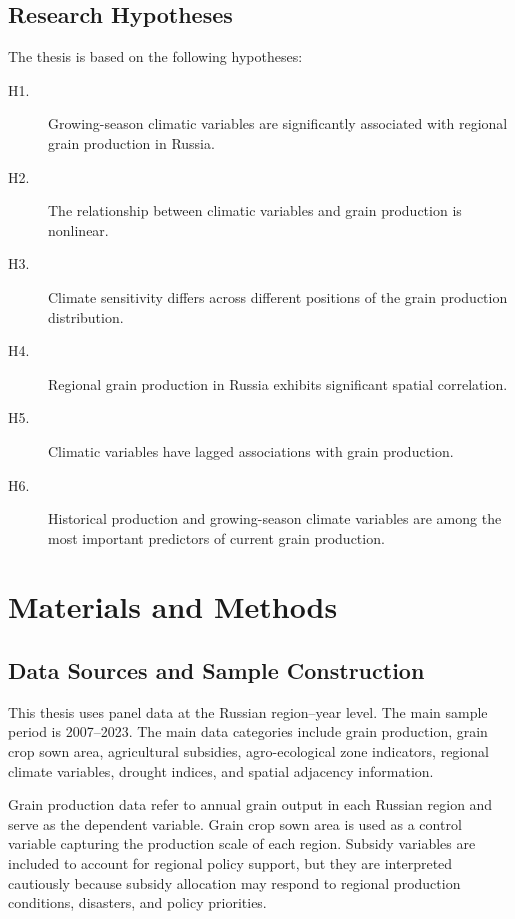 \documentclass[12pt,a4paper]{article}
\begin{document}
\subsection{Research Hypotheses}

The thesis is based on the following hypotheses:

\begin{description}
    \item[H1.] Growing-season climatic variables are significantly associated with regional grain production in Russia.
    \item[H2.] The relationship between climatic variables and grain production is nonlinear.
    \item[H3.] Climate sensitivity differs across different positions of the grain production distribution.
    \item[H4.] Regional grain production in Russia exhibits significant spatial correlation.
    \item[H5.] Climatic variables have lagged associations with grain production.
    \item[H6.] Historical production and growing-season climate variables are among the most important predictors of current grain production.
\end{description}

\section{Materials and Methods}

\subsection{Data Sources and Sample Construction}

This thesis uses panel data at the Russian region--year level. The main sample period is 2007--2023. The main data categories include grain production, grain crop sown area, agricultural subsidies, agro-ecological zone indicators, regional climate variables, drought indices, and spatial adjacency information.

Grain production data refer to annual grain output in each Russian region and serve as the dependent variable. Grain crop sown area is used as a control variable capturing the production scale of each region. Subsidy variables are included to account for regional policy support, but they are interpreted cautiously because subsidy allocation may respond to regional production conditions, disasters, and policy priorities.
\end{document}
